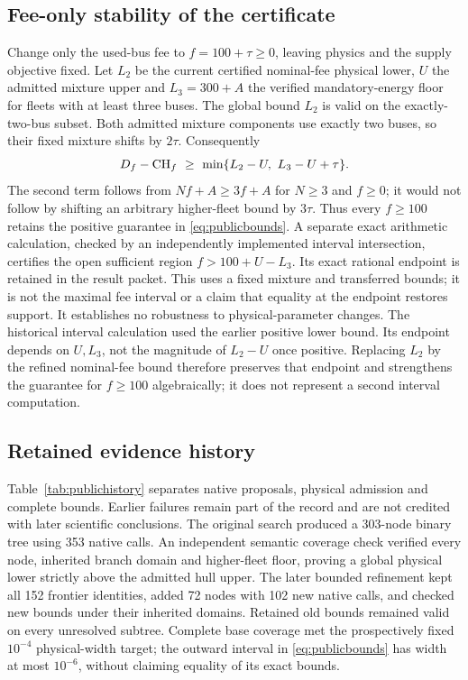 \subsection{Fee-only stability of the certificate}\label{app:publicfee}
Change only the used-bus fee to $f=100+\tau\ge0$, leaving physics and
the supply objective fixed. Let $L_2$ be the current certified nominal-fee physical
lower, $U$ the admitted mixture upper and $L_3=300+A$ the verified
mandatory-energy floor for fleets with at least three buses. The global
bound $L_2$ is valid on the exactly-two-bus subset. Both admitted mixture
components use exactly two buses, so their fixed mixture shifts by
$2\tau$. Consequently
\begin{equation}\label{eq:feestability}
 D_f-\mathrm{CH}_f\ \ge\
 \min\{L_2-U,\ L_3-U+\tau\}.
\end{equation}
The second term follows from $Nf+A\ge3f+A$ for $N\ge3$ and $f\ge0$;
it would not follow by shifting an arbitrary higher-fleet bound by $3\tau$.
Thus every $f\ge100$ retains the positive guarantee in
\eqref{eq:publicbounds}. A separate exact arithmetic calculation, checked
by an independently implemented interval intersection, certifies the open
sufficient region $f>100+U-L_3$. Its exact rational endpoint is retained in
the result packet. This uses a fixed mixture and transferred bounds; it is
not the maximal fee interval or a claim that equality at the endpoint
restores support. It establishes no robustness to physical-parameter changes.
The historical interval calculation used the earlier positive lower bound.
Its endpoint depends on $U,L_3$, not the magnitude of $L_2-U$ once positive.
Replacing $L_2$ by the refined nominal-fee bound therefore preserves that
endpoint and strengthens the guarantee for $f\ge100$ algebraically; it
does not represent a second interval computation.

\subsection{Retained evidence history}
\label{app:publichistory}
Table~\ref{tab:publichistory} separates native proposals, physical admission
and complete bounds. Earlier failures remain part of the record and are
not credited with later scientific conclusions.
The original search produced a 303-node binary tree using 353 native calls.
An independent semantic coverage check verified every node, inherited
branch domain and higher-fleet floor, proving a global physical lower
strictly above the admitted hull upper. The later bounded refinement kept
all 152 frontier identities, added 72 nodes with 102 new native calls, and
checked new bounds under their inherited domains. Retained old bounds
remained valid on every unresolved subtree. Complete base coverage met
the prospectively fixed $10^{-4}$ physical-width target; the outward
interval in \eqref{eq:publicbounds} has width at most $10^{-6}$, without
claiming equality of its exact bounds.


